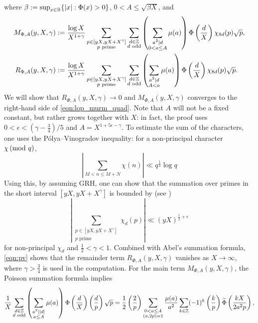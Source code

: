 where $\beta := \sup_{x \in \mathbb{R}}\{|x|: \Phi(x) > 0\}$, $0 < A \le \sqrt{\beta X}$, and
\begin{align}
    M_{\Phi, A}(y, X, \gamma) &:= \frac{\log X}{X^{1 + \gamma}} \sum_{\substack{p \in [yX, yX + X^\gamma] \\ p \text{ prime}}} \sum_{\substack{d \in \mathbb{Z} \\ d \text{ odd}}} \left(\sum_{\substack{a^2 \mid d \\ 0 < a \le A}}\mu(a)\right) \Phi\left(\frac{d}{X}\right) \chi_{8d}(p) \sqrt{p}, \label{eqn:MA} \\
    R_{\Phi, A}(y, X, \gamma) &:= \frac{\log X}{X^{1 + \gamma}} \sum_{\substack{p \in [yX, yX + X^\gamma] \\ p \text{ prime}}} \sum_{\substack{d \in \mathbb{Z} \\ d \text{ odd}}} \left(\sum_{\substack{a^2 \mid d \\ A < a}}\mu(a)\right) \Phi\left(\frac{d}{X}\right) \chi_{8d}(p) \sqrt{p}. \label{eqn:RA}
\end{align}
We will show that $R_{\Phi, A}(y, X, \gamma) \to 0$ and $M_{\Phi, A}(y, X, \gamma)$ converges to the right-hand side of \eqref{eqn:lop_murm_quad}.
Note that $A$ will not be a fixed constant, but rather grows together with $X$: in fact, the proof uses $0 < \epsilon < (\gamma - \frac{3}{4}) / 5$ and $A = X^{1 + 5 \epsilon - \gamma}$.
To estimate the sum of the characters, one uses the Pólya--Vinogradov inequality: for a non-principal character $\chi \,(\text{mod }q)$,
\begin{equation}
    \label{eqn:pv_basic}
    \left|\sum_{M < n \le M + N} \chi(n)\right| \ll q^{\frac{1}{2}} \log q
\end{equation}
Using this, by assuming GRH, one can show that the summation over primes in the short interval $[yX, yX + X^\gamma]$ is bounded by (see \cite[eq. (5.1)]{granville2007large})
\begin{equation}
    \label{eqn:pv}
    \left|\sum_{\substack{p \in [yX, yX + X^\gamma] \\ p\text{ prime}}} \chi_d(p)\right| \ll (yX)^{\frac{1}{2} + \epsilon}
\end{equation}
for non-principal $\chi_d$ and $\frac{1}{2} < \gamma < 1$.
Combined with Abel's summation formula, \eqref{eqn:pv} shows that the remainder term $R_{\Phi, A}(y, X, \gamma)$ vanishes as $X \to \infty$, where $\gamma > \frac{3}{4}$ is used in the computation.
For the main term $M_{\Phi, A}(y, X, \gamma)$, the Poisson summation formula implies \cite[Lemma 2.11]{lee2025murmurations}
\[
\frac{1}{X} \sum_{\substack{d \in \mathbb{Z} \\ d \text{ odd}}} \left(\sum_{\substack{a^2 \mid |d| \\ a \le A}} \mu(a)\right) \Phi\left(\frac{d}{X}\right) \left(\frac{d}{p}\right) \sqrt{p} = \frac{1}{2} \left(\frac{2}{p}\right) \sum_{\substack{0 < a \le A \\ (a, 2p) = 1}} \frac{\mu(a)}{a^2} \sum_{k \in \mathbb{Z}} (-1)^k \left(\frac{k}{p}\right) \widetilde{\Phi} \left(\frac{k X}{2 a^2 p}\right),
\]
